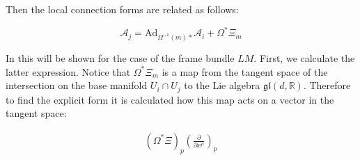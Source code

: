 Then the local connection forms are related as follows:

\[ \mathcal{A}_j = \text{Ad}_{\Omega^{-1}(m)*} \mathcal{A}_i + \Omega^*\Xi_m \]

In this will be shown for the case of the frame bundle $LM$. First, we calculate the latter expression. Notice that $\Omega^*\Xi_m$ is a map from the tangent space of the intersection on the base manifold \( U_i \cap U_j \) to the Lie algebra \( \mathfrak{gl}(d, \mathbb{R}) \). Therefore to find the explicit form it is calculated how this map acts on a vector in the tangent space:

\begin{align*}
  (\Omega^*\Xi)_p \left( \frac{\partial}{\partial x^\mu} \right)_p  
\end{align*}


